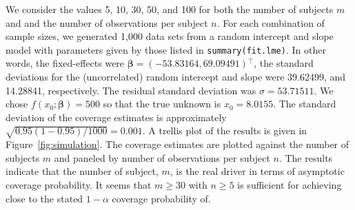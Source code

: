 \documentclass{article}\usepackage[]{graphicx}\usepackage[]{color}
\newcommand{\trans}{\ensuremath{^\top}}
\begin{document}
We consider the values 5, 10, 30, 50, and 100 for both the number of subjects $m$ and and the number of observations per subject $n$.  For each combination of sample sizes, we generated 1,000 data sets from a random intercept and slope model with parameters given by those listed in \texttt{summary(fit.lme)}.  In other words, the fixed-effects were $\bm{\beta} = \left(-53.83164, 69.09491\right)\trans$, the standard deviations for the (uncorrelated) random intercept and slope were 39.62499, and 14.28841, respectively.  The residual standard deviation was $\sigma = 53.71511$.  We chose $f\left(x_0; \bm{\beta}\right) = 500$ so that the true unknown is $x_0 = 8.0155$.  The standard deviation of the coverage estimates is approximately $\sqrt{0.95\left(1-0.95\right)/1000} = 0.001$.  A trellis plot of the results is given in Figure~\ref{fig:simulation}.  The coverage estimates are plotted against the number of subjects $m$ and paneled by number of observations per subject $n$. The results indicate that the number of subject, $m$, is the real driver in terms of asymptotic coverage probability. It seems that $m \ge 30$ with $n \ge 5$ is sufficient for achieving close to the stated $1 - \alpha$ coverage probability of. 
\end{document}
